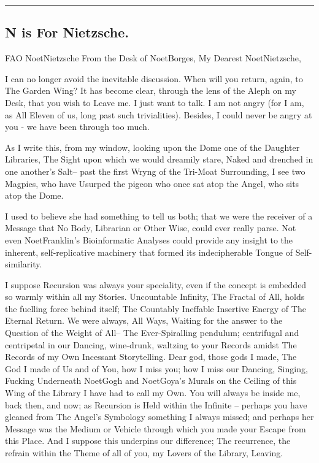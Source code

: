 \documentclass[
]{article}
\begin{document}
\begin{center}\rule{0.5\linewidth}{0.5pt}\end{center}

\subsection{N is For Nietzsche.}\label{n-is-for-nietzsche.}

FAO NoetNietzsche From the Desk of NoetBorges, My Dearest NoetNietzsche,

I can no longer avoid the inevitable discussion. When will you return,
again, to The Garden Wing? It has become clear, through the lens of the
Aleph on my Desk, that you wish to Leave me. I just want to talk. I am
not angry (for I am, as All Eleven of us, long past such trivialities).
Besides, I could never be angry at you - we have been through too much.

As I write this, from my window, looking upon the Dome one of the
Daughter Libraries, The Sight upon which we would dreamily stare, Naked
and drenched in one another's Salt-- past the first Wryng of the
Tri-Moat Surrounding, I see two Magpies, who have Usurped the pigeon who
once sat atop the Angel, who sits atop the Dome.

I used to believe she had something to tell us both; that we were the
receiver of a Message that No Body, Librarian or Other Wise, could ever
really parse. Not even NoetFranklin's Bioinformatic Analyses could
provide any insight to the inherent, self-replicative machinery that
formed its indecipherable Tongue of Self-similarity.

I suppose Recursion was always your speciality, even if the concept is
embedded so warmly within all my Stories. Uncountable Infinity, The
Fractal of All, holds the fuelling force behind itself; The Countably
Ineffable Insertive Energy of The Eternal Return. We were always, All
Ways, Waiting for the answer to the Question of the Weight of All-- The
Ever-Spiralling pendulum; centrifugal and centripetal in our Dancing,
wine-drunk, waltzing to your Records amidst The Records of my Own
Incessant Storytelling. Dear god, those gods I made, The God I made of
Us and of You, how I miss you; how I miss our Dancing, Singing, Fucking
Underneath NoetGogh and NoetGoya's Murals on the Ceiling of this Wing of
the Library I have had to call my Own. You will always be inside me,
back then, and now; as Recursion is Held within the Infinite -- perhaps
you have gleaned from The Angel's Symbology something I always missed;
and perhaps her Message was the Medium or Vehicle through which you made
your Escape from this Place. And I suppose this underpins our
difference; The recurrence, the refrain within the Theme of all of you,
my Lovers of the Library, Leaving.
\end{document}
